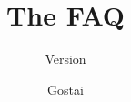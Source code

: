\documentclass{gostai-report}
\title{The \urbi FAQ}
\subtitle{Version \VcsDescription}
\author{Gostai}
\begin{document}
\maketitle
\tableofcontents
\savesections
\raisesections
\let\chapter\section

\restoresections
\chapterIndex
\end{document}
